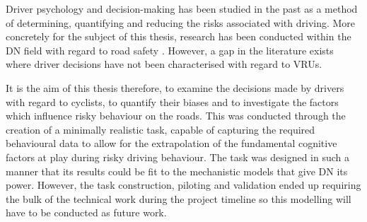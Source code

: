Driver psychology and decision-making has been studied in the past as a method of determining, quantifying and reducing the risks associated with driving. More concretely for the subject of this thesis, research has been conducted within the DN field with regard to road safety \citep{pekkanenVariableDriftDiffusionModels2022}. However, a gap in the literature exists where driver decisions have not been characterised with regard to VRUs.

It is the aim of this thesis therefore, to examine the decisions made by drivers with regard to cyclists, to quantify their biases and to investigate the factors which influence risky behaviour on the roads. This was conducted through the creation of a minimally realistic task, capable of capturing the required behavioural data to allow for the extrapolation of the fundamental cognitive factors at play during risky driving behaviour. The task was designed in such a manner that its results could be fit to the mechanistic models that give DN its power. However, the task construction, piloting and validation ended up requiring the bulk of the technical work during the project timeline so this modelling will have to be conducted as future work.